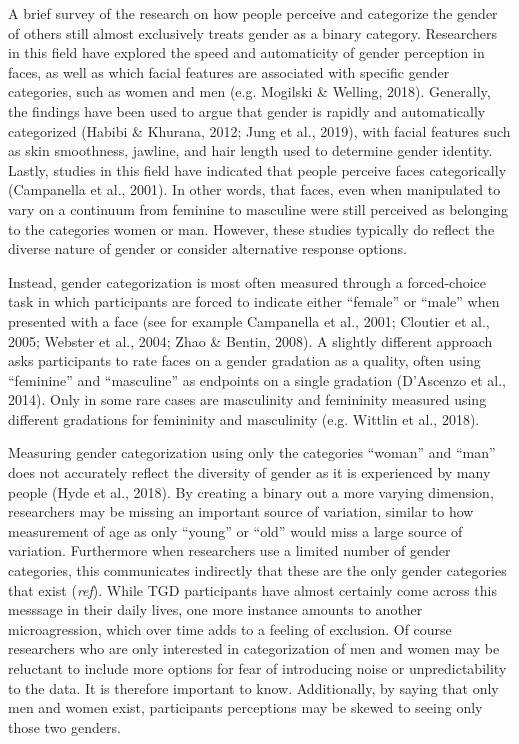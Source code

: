 \documentclass[
  man]{apa7}
\begin{document}
A brief survey of the research on how people perceive and categorize the gender of others still almost exclusively treats gender as a binary category. Researchers in this field have explored the speed and automaticity of gender perception in faces, as well as which facial features are associated with specific gender categories, such as women and men (e.g. Mogilski \& Welling, 2018). Generally, the findings have been used to argue that gender is rapidly and automatically categorized (Habibi \& Khurana, 2012; Jung et al., 2019), with facial features such as skin smoothness, jawline, and hair length used to determine gender identity. Lastly, studies in this field have indicated that people perceive faces categorically (Campanella et al., 2001). In other words, that faces, even when manipulated to vary on a continuum from feminine to masculine were still perceived as belonging to the categories women or man. However, these studies typically do reflect the diverse nature of gender or consider alternative response options.

Instead, gender categorization is most often measured through a forced-choice task in which participants are forced to indicate either ``female'' or ``male'' when presented with a face (see for example Campanella et al., 2001; Cloutier et al., 2005; Webster et al., 2004; Zhao \& Bentin, 2008). A slightly different approach asks participants to rate faces on a gender gradation as a quality, often using ``feminine'' and ``masculine'' as endpoints on a single gradation (D'Ascenzo et al., 2014). Only in some rare cases are masculinity and femininity measured using different gradations for femininity and masculinity (e.g. Wittlin et al., 2018).

Measuring gender categorization using only the categories ``woman'' and ``man'' does not accurately reflect the diversity of gender as it is experienced by many people (Hyde et al., 2018). By creating a binary out a more varying dimension, researchers may be missing an important source of variation, similar to how measurement of age as only ``young'' or ``old'' would miss a large source of variation. Furthermore when researchers use a limited number of gender categories, this communicates indirectly that these are the only gender categories that exist (\emph{ref}). While TGD participants have almost certainly come across this messsage in their daily lives, one more instance amounts to another microagression, which over time adds to a feeling of exclusion. Of course researchers who are only interested in categorization of men and women may be reluctant to include more options for fear of introducing noise or unpredictability to the data. It is therefore important to know. Additionally, by saying that only men and women exist, participants perceptions may be skewed to seeing only those two genders.
\end{document}

